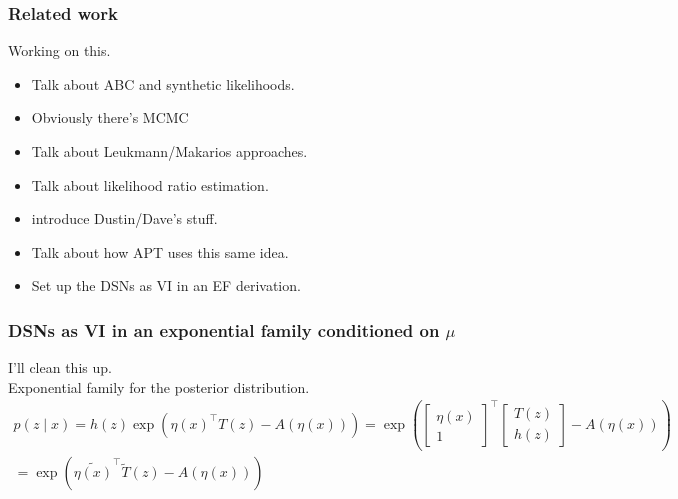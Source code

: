 \documentclass[11pt]{article}
\begin{document}
\subsubsection{Related work}
Working on this.
\begin{itemize}
\item Talk about ABC and synthetic likelihoods.
\item Obviously there's MCMC
\item Talk about Leukmann/Makarios approaches.
\item Talk about likelihood ratio estimation.
\item introduce Dustin/Dave's stuff.
\item Talk about how APT uses this same idea.
\item Set up the DSNs as VI in an EF derivation.
\end{itemize}

\subsubsection{DSNs as VI in an exponential family conditioned on $\mu$}
I'll clean this up. \\

Exponential family for the posterior distribution.
\begin{equation}
\begin{split}
p(z \mid x) = h(z) \exp{\left( \eta(x)^\top T(z) - A(\eta(x)) \right)} = \exp{\left( \begin{bmatrix} \eta(x) \\ 1 \end{bmatrix}^\top \begin{bmatrix} T(z) \\ h(z) \end{bmatrix} - A(\eta(x)) \right)} \\= \exp{\left(\tilde{\eta(x)}^\top \tilde{T}(z) - A(\eta(x)) \right)} 
\end{split}
\end{equation}
\end{document}
